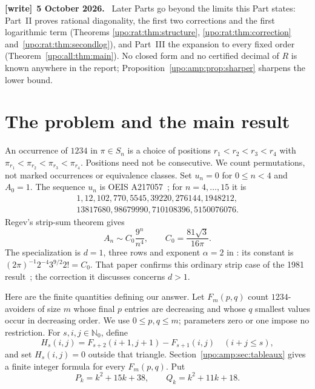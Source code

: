 \documentclass[11pt,letterpaper]{article}
\theoremstyle{remark}\newtheorem{remark}[theorem]{Remark}
\numberwithin{equation}{section}
\newcommand{\N}{\mathbb N_0}
\newenvironment{writenote}[1][]{\par\smallskip\begingroup\small
 \noindent\textbf{[write]}\if\relax\detokenize{#1}\relax\else~\textbf{#1.}\fi\ }%
 {\par\endgroup\smallskip}
\begin{document}
\begin{writenote}[5 October 2026]
Later Parts go beyond the limits this Part states: Part~II proves rational diagonality, the first two corrections and the first logarithmic term (Theorems \ref{upo:rat:thm:structure}, \ref{upo:rat:thm:correction} and~\ref{upo:rat:thm:secondlog}), and Part~III the expansion to every fixed order (Theorem~\ref{upo:all:thm:main}). No closed form and no certified decimal of $R$ is known anywhere in the report; Proposition~\ref{upo:amp:prop:sharper} sharpens the lower bound.
\end{writenote}


\section{The problem and the main result}\label{upo:amp:sec:intro}
An occurrence of $1234$ in $\pi\in S_n$ is a choice of positions
$r_1<r_2<r_3<r_4$ with
$\pi_{r_1}<\pi_{r_2}<\pi_{r_3}<\pi_{r_4}$. Positions need not be consecutive.
We count permutations, not marked occurrences or equivalence classes.
Set $u_n=0$ for $0\le n<4$ and $A_0=1$. The sequence $u_n$ is
OEIS A217057~\cite{OEIS217057}; for $n=4,\ldots,15$ it is
\begin{gather*}
1,12,102,770,5545,39220,276144,1948212,\\
13817680,98679990,710108396,5150076076.
\end{gather*}
Regev's strip-sum theorem gives
\begin{equation}\label{upo:amp:eq:regev}
A_n\sim C_0\frac{9^n}{n^4},\qquad C_0=\frac{81\sqrt3}{16\pi}.
\end{equation}
The specialization is $d=1$, three rows and exponent $\alpha=2$ in
\cite[Section 3.1.4]{Regev2010}: its constant is
$(2\pi)^{-1}2^{-4}3^{9/2}2!=C_0$.
That paper confirms this ordinary strip case of the 1981 result~\cite{Regev1981};
the correction it discusses concerns $d>1$.

Here are the finite quantities defining our answer. Let $F_m(p,q)$ count
$1234$-avoiders of size $m$ whose final $p$ entries are decreasing and whose
$q$ smallest values occur in decreasing order. We use $0\le p,q\le m$;
parameters zero or one impose no restriction. For $s,i,j\in\N$, define
\begin{equation}\label{upo:amp:eq:H}
H_s(i,j)=F_{s+2}(i+1,j+1)-F_{s+1}(i,j)\quad(i+j\le s),
\end{equation}
and set $H_s(i,j)=0$ outside that triangle. Section~\ref{upo:amp:sec:tableaux}
gives a finite integer formula for every $F_m(p,q)$.
Put
\begin{equation}\label{upo:amp:eq:PQ}
P_k=k^2+15k+38,\qquad Q_k=k^2+11k+18.
\end{equation}
\end{document}
